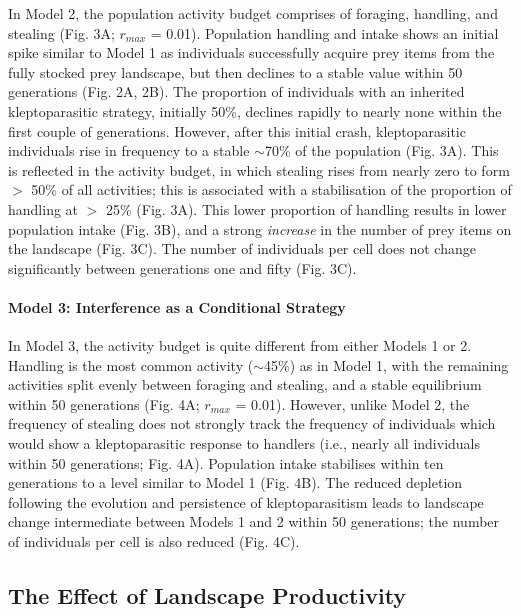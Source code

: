 \documentclass[11pt]{article}
\begin{document}
In Model 2, the population activity budget comprises of foraging, handling, and stealing (Fig. 3A; $r_{max}$ = 0.01).
Population handling and intake shows an initial spike similar to Model 1 as individuals successfully acquire prey items from the fully stocked prey landscape, but then declines to a stable value within 50 generations (Fig. 2A, 2B).
The proportion of individuals with an inherited kleptoparasitic strategy, initially 50\%, declines rapidly to nearly none within the first couple of generations. 
However, after this initial crash, kleptoparasitic individuals rise in frequency to a stable $\sim$70\% of the population (Fig. 3A).
This is reflected in the activity budget, in which stealing rises from nearly zero to form $>$ 50\% of all activities; this is associated with a stabilisation of the proportion of handling at $>$ 25\% (Fig. 3A).
This lower proportion of handling results in lower population intake (Fig. 3B), and a strong \textit{increase} in the number of prey items on the landscape (Fig. 3C).
The number of individuals per cell does not change significantly between generations one and fifty (Fig. 3C).

\paragraph{Model 3: Interference as a Conditional Strategy}

In Model 3, the activity budget is quite different from either Models 1 or 2.
Handling is the most common activity ($\sim$45\%) as in Model 1, with the remaining activities split evenly between foraging and stealing, and a stable equilibrium within 50 generations (Fig. 4A; $r_{max}$ = 0.01).
However, unlike Model 2, the frequency of stealing does not strongly track the frequency of individuals which would show a kleptoparasitic response to handlers (i.e., nearly all individuals within 50 generations; Fig. 4A).
Population intake stabilises within ten generations to a level similar to Model 1 (Fig. 4B).
The reduced depletion following the evolution and persistence of kleptoparasitism leads to landscape change intermediate between Models 1 and 2 within 50 generations; the number of individuals per cell is also reduced (Fig. 4C).

\subsection{The Effect of Landscape Productivity}
\end{document}
